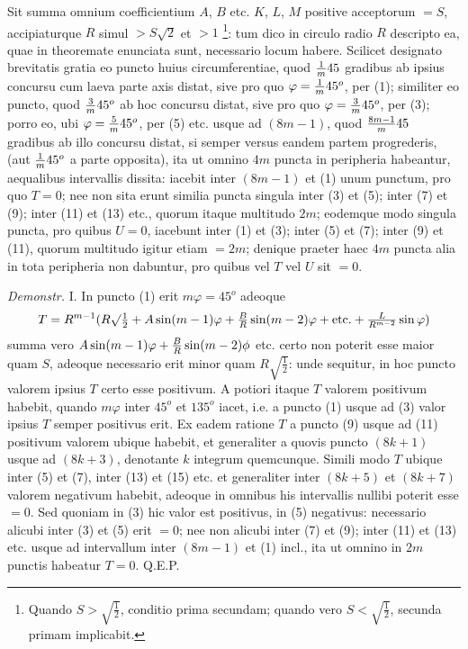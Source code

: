 \documentclass[twoside,12pt, showframe]{memoir}
\let\oldfrac\frac
\def\frac#1#2{\mathchoice{\tfrac{#1}{#2}}{\oldfrac{#1}{#2}}{\genfrac{}{}{}{2}{#1}{#2\mathstrut}}{\genfrac{}{}{}{3}{#1}{#2\mathstrut}}}
\begin{document}
Sit summa omnium coefficientium \(A\), \(B\) etc{.} \(K\), \(L\), \(M\) positive acceptorum \(= S\), accipiaturque \(R\) simul \(>S\surd{2}\) et \(>1\) \footnote{Quando \(S>\surd{\tfrac{1}{2}}\), conditio prima secundam; quando vero \(S<\surd{\tfrac{1}{2}}\), secunda primam implicabit.}: tum dico in circulo radio \(R\) descripto ea, quae in theoremate enunciata sunt, necessario locum habere. Scilicet designato brevitatis gratia eo puncto huius circumferentiae, quod \(\frac{1}{m}45\) gradibus ab ipsius concursu cum laeva parte axis distat, sive pro quo \(\varphi = \frac{1}{m} 45^o\), per (1); similiter eo puncto, quod \(\frac{3}{m} 45^o\) ab hoc concursu distat, sive pro quo \(\varphi = \frac{3}{m} 45^o\), per (3); porro eo, ubi \(\varphi = \frac{5}{m} 45^o\), per (5) etc{.} usque ad \((8m-1)\), quod \(\frac{8m-1}{m} 45\) gradibus ab illo concursu distat, si semper versus eandem partem progrederis, (aut \(\frac{1}{m}45^o\) a parte opposita), ita ut omnino \(4m\) puncta in peripheria habeantur, aequalibus intervallis dissita: iacebit inter \((8m-1)\) et (1) unum punctum, pro quo \(T= 0\); nee non sita erunt similia puncta singula inter (3) et (5); inter (7) et (9); inter (11) et (13) etc{.}, quorum itaque multitudo \(2m\); eodemque modo singula puncta, pro quibus \(U=0\), iacebunt inter (1) et (3); inter (5) et (7); inter (9) et (11), quorum multitudo igitur etiam \(= 2m\); denique praeter haec \(4m\) puncta alia in tota peripheria non dabuntur, pro quibus vel \(T\) vel \(U\) sit \(= 0\).

\textit{Demonstr.} I. In puncto (1) erit  \(m\varphi = 45^o\) adeoque \[ T = R^{m-1}(R\surd \tfrac{1}{2} + A \sin (m-1)\varphi + \frac{B}{R} \sin (m-2) \varphi + \text{etc{.}}+\frac{L}{R^{m-2}}\sin \varphi )\] summa vero \(A \sin (m-1) \varphi + \frac{B}{R} \sin (m-2) \phi \) etc{.} certo non poterit esse maior quam \(S\), adeoque necessario erit minor quam \(R\surd{\tfrac{1}{2}}\): unde sequitur, in hoc puncto valorem ipsius \(T\) certo esse positivum. A potiori itaque \(T\) valorem positivum habebit, quando \(m\varphi\) inter \(45^o\) et \(135^o\) iacet, i.e. a puncto (1) usque ad (3) valor ipsius \(T\) semper positivus erit. Ex eadem ratione \(T\) a puncto (9) usque ad (11) positivum valorem ubique habebit, et generaliter a quovis puncto \((8k+1)\) usque ad \((8k+3)\), denotante \(k\) integrum quemcunque. Simili modo \(T\) ubique inter (5) et (7), inter (13) et (15) etc{.} et generaliter inter \((8k + 5)\) et \((8k+7)\) valorem negativum habebit, adeoque in omnibus his intervallis nullibi poterit esse \(= 0\). Sed quoniam in (3) hic valor est positivus, in (5) negativus: necessario alicubi inter (3) et (5) erit \(= 0\);  nee non alicubi inter (7) et (9);  inter (11) et (13) etc{.} usque ad intervallum inter \((8m-1)\) et (1) incl., ita ut omnino in \(2m\) punctis habeatur  \(T = 0\).  Q.E.P.
\end{document}
